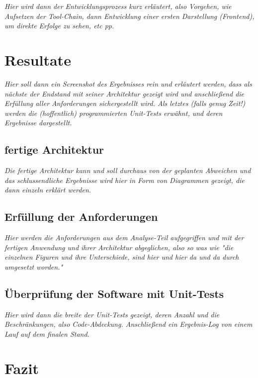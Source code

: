 \emph{Hier wird dann der Entwicklungsprozess kurz erläutert, also Vorgehen, wie Aufsetzen der Tool-Chain, dann Entwicklung einer ersten Darstellung (Frontend), um direkte Erfolge zu sehen, etc pp.}

\section{Resultate}
\label{sec:Resultate}

\emph{Hier soll dann ein Screenshot des Ergebnisses rein und erläutert werden, dass als nächste der Endstand mit seiner Architektur gezeigt wird und anschließend die Erfüllung aller Anforderungen sichergestellt wird. Als letztes (falls genug Zeit!) werden die (hoffentlich) programmierten Unit-Tests erwähnt, und deren Ergebnisse dargestellt.}

\subsection{fertige Architektur}
\label{subsec:f_architektur}

\emph{Die fertige Architektur kann und soll durchaus von der geplanten Abweichen und das schlussendliche Ergebnisse wird hier in Form von Diagrammen gezeigt, die dann einzeln erklärt werden.}

\subsection{Erfüllung der Anforderungen}
\label{subsec:erfullung_anforderungen}

\emph{Hier werden die Anforderungen aus dem Analyse-Teil aufgegriffen und mit der fertigen Anwendung und ihrer Architektur abgeglichen, also so was wie "die einzelnen Figuren und ihre Unterschiede, sind hier und hier da und da durch umgesetzt worden."}

\subsection{Überprüfung der Software mit Unit-Tests}
\label{subsec:unittests}

\emph{Hier wird dann die breite der Unit-Tests gezeigt, deren Anzahl und die Beschränkungen, also Code-Abdeckung. Anschließend ein Ergebnis-Log von einem Lauf auf dem finalen Stand.}


\section{Fazit}
\label{sec:Fazit}